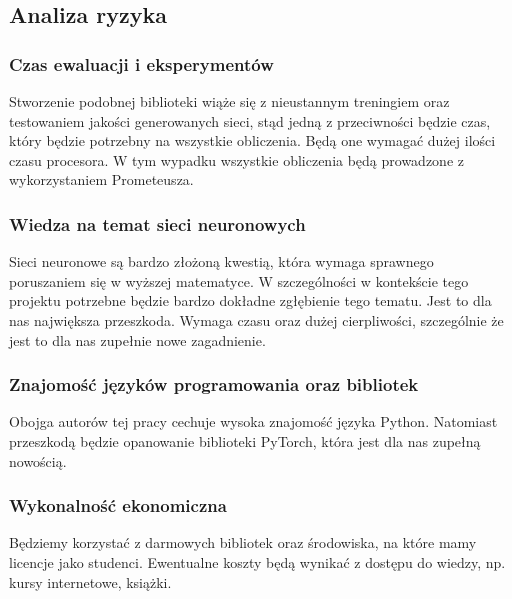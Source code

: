 \subsection{Analiza ryzyka}

\subsubsection{Czas ewaluacji i eksperymentów}
Stworzenie podobnej biblioteki wiąże się z nieustannym treningiem oraz testowaniem jakości 
generowanych sieci, stąd jedną z przeciwności będzie czas, który będzie potrzebny na wszystkie 
obliczenia. Będą one wymagać dużej ilości czasu procesora. W tym wypadku wszystkie obliczenia 
będą prowadzone z wykorzystaniem Prometeusza.

\subsubsection{Wiedza na temat sieci neuronowych}
Sieci neuronowe są bardzo złożoną kwestią, która wymaga sprawnego poruszaniem się w wyższej 
matematyce. W szczególności w kontekście tego projektu potrzebne będzie bardzo dokładne zgłębienie 
tego tematu. Jest to dla nas największa przeszkoda. Wymaga czasu oraz dużej cierpliwości, 
szczególnie że jest to dla nas zupełnie nowe zagadnienie.

\subsubsection{Znajomość języków programowania oraz bibliotek }
Obojga autorów tej pracy cechuje wysoka znajomość języka Python. Natomiast przeszkodą będzie 
opanowanie biblioteki PyTorch, która jest dla nas zupełną nowością.

\subsubsection{Wykonalność ekonomiczna }
Będziemy korzystać z darmowych bibliotek oraz środowiska, na które mamy licencje jako studenci. 
Ewentualne koszty będą wynikać z dostępu do wiedzy, np. kursy internetowe, książki.